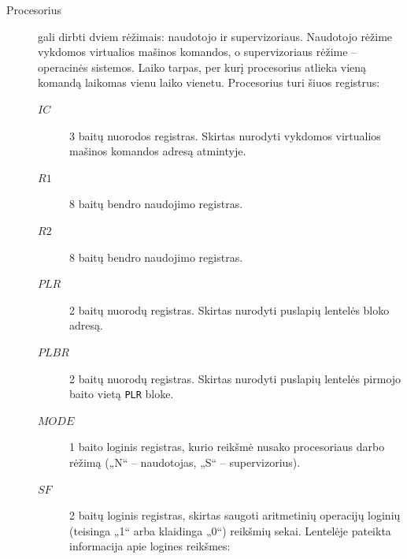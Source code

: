 \begin{description}
  \item[Procesorius] gali dirbti dviem rėžimais: naudotojo ir 
    supervizoriaus. Naudotojo rėžime vykdomos virtualios mašinos komandos,
    o supervizoriaus rėžime – operacinės sistemos. Laiko tarpas, per
    kurį procesorius atlieka vieną komandą laikomas vienu laiko vienetu.
    Procesorius turi šiuos registrus:
    \begin{description}
      \item[$IC$] 3 baitų nuorodos registras. Skirtas nurodyti vykdomos 
        virtualios mašinos komandos adresą atmintyje.
      \item[$R1$] 8 baitų bendro naudojimo registras.
      \item[$R2$] 8 baitų bendro naudojimo registras.
      \item[$PLR$] 2 baitų nuorodų registras. Skirtas nurodyti puslapių 
        lentelės bloko adresą.
      \item[$PLBR$] 2 baitų nuorodų registras. Skirtas nurodyti puslapių 
        lentelės pirmojo baito vietą \verb|PLR| bloke.
      \item[$MODE$] 1 baito loginis registras, kurio reikšmė nusako 
        procesoriaus darbo rėžimą („N“ – naudotojas, „S“ – supervizorius).
      \item[$SF$] 2 baitų loginis registras, skirtas saugoti aritmetinių 
        operacijų loginių (teisinga „1“ arba klaidinga „0“) reikšmių sekai. 
        Lentelėje pateikta informacija apie logines reikšmes:


\end{description}
\end{description}
